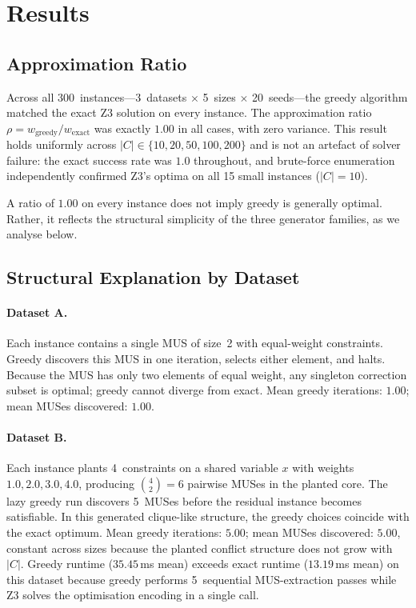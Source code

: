 \section{Results}
\label{sec:results}

\subsection{Approximation Ratio}

Across all 300~instances---3~datasets $\times$ 5~sizes $\times$ 20~seeds---the
greedy algorithm matched the exact Z3 solution on every instance.
The approximation ratio $\rho = w_{\text{greedy}} / w_{\text{exact}}$ was
exactly $1.00$ in all cases, with zero variance.
This result holds uniformly across $|C| \in \{10, 20, 50, 100, 200\}$ and is
not an artefact of solver failure: the exact success rate was $1.0$ throughout,
and brute-force enumeration independently confirmed Z3's optima on all 15
small instances ($|C| = 10$).

A ratio of $1.00$ on every instance does not imply greedy is generally optimal.
Rather, it reflects the structural simplicity of the three generator families,
as we analyse below.

\subsection{Structural Explanation by Dataset}

\paragraph{Dataset A.}
Each instance contains a single MUS of size~2 with equal-weight constraints.
Greedy discovers this MUS in one iteration, selects either element, and halts.
Because the MUS has only two elements of equal weight, any singleton correction
subset is optimal; greedy cannot diverge from exact.
Mean greedy iterations: $1.00$; mean MUSes discovered: $1.00$.

\paragraph{Dataset B.}
Each instance plants 4~constraints on a shared variable $x$ with weights
$1.0, 2.0, 3.0, 4.0$, producing $\binom{4}{2} = 6$ pairwise MUSes in the
planted core.
The lazy greedy run discovers 5~MUSes before the residual instance becomes
satisfiable.
In this generated clique-like structure, the greedy choices coincide with the
exact optimum.
Mean greedy iterations: $5.00$; mean MUSes discovered: $5.00$, constant across
sizes because the planted conflict structure does not grow with $|C|$.
Greedy runtime ($35.45$\,ms mean) exceeds exact runtime ($13.19$\,ms mean) on
this dataset because greedy performs 5~sequential MUS-extraction passes while
Z3 solves the optimisation encoding in a single call.

